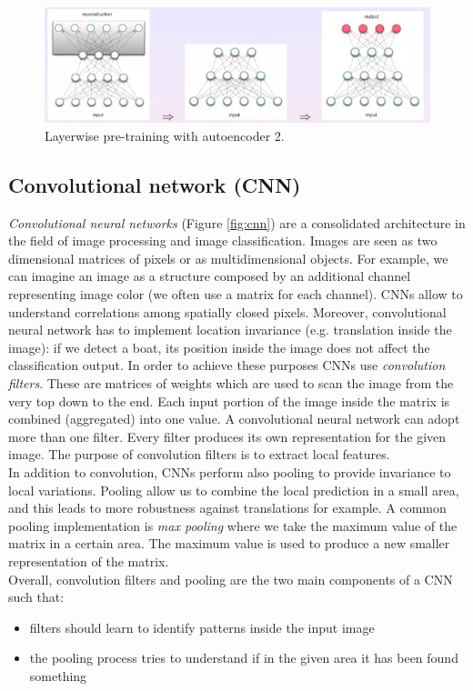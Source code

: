 \begin{figure}
    \centering
    \includegraphics[width=\textwidth]{images/autoencoder_layerwise2.png}
    \caption{Layerwise pre-training with autoencoder 2.}
    \label{fig:autoencoder_layerwise2}
\end{figure}

\subsection{Convolutional network (CNN)}
\textit{Convolutional neural networks} (Figure \ref{fig:cnn}) are a consolidated architecture in the field of image processing and image classification. Images are seen as two dimensional matrices of pixels or as multidimensional objects. For example, we can imagine an image as a structure composed by an additional channel representing image color (we often use a matrix for each channel). CNNs allow to understand correlations among spatially closed pixels. Moreover, convolutional neural network has to implement location invariance (e.g. translation inside the image): if we detect a boat, its position inside the image does not affect the classification output. In order to achieve these purposes CNNs use \textit{convolution filters}. These are matrices of weights which are used to scan the image from the very top down to the end. Each input portion of the image inside the matrix is combined (aggregated) into one value. A convolutional neural network can adopt more than one filter. Every filter produces its own representation for the given image. The purpose of convolution filters is to extract local features. \\ In addition to convolution, CNNs perform also pooling to provide invariance to local variations. Pooling allow us to combine the local prediction in a small area, and this leads to more robustness against translations for example. A common pooling implementation is \textit{max pooling} where we take the maximum value of the matrix in a certain area. The maximum value is used to produce a new smaller representation of the matrix. \\ Overall, convolution filters and pooling are the two main components of a CNN such that:
\begin{itemize}
    \item filters should learn to identify patterns inside the input image
    
    \item the pooling process tries to understand if in the given area it has been found something 
\end{itemize}

